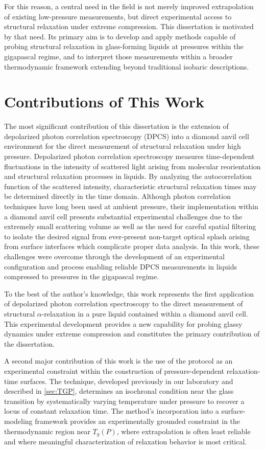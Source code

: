 For this reason, a central need in the field is not merely improved extrapolation of existing low-pressure measurements, but direct experimental access to structural relaxation under extreme compression. This dissertation is motivated by that need. Its primary aim is to develop and apply methods capable of probing structural relaxation in glass-forming liquids at pressures within the gigapascal regime, and to interpret those measurements within a broader thermodynamic framework extending beyond traditional isobaric descriptions.

\section{Contributions of This Work}

The most significant contribution of this dissertation is the extension of depolarized photon correlation spectroscopy (DPCS) into a diamond anvil cell environment for the direct measurement of structural relaxation under high pressure. Depolarized photon correlation spectroscopy measures time-dependent fluctuations in the intensity of scattered light arising from molecular reorientation and structural relaxation processes in liquids. By analyzing the autocorrelation function of the scattered intensity, characteristic structural relaxation times may be determined directly in the time domain. Although photon correlation techniques have long been used at ambient pressure, their implementation within a diamond anvil cell presents substantial experimental challenges due to the extremely small scattering volume as well as the need for careful spatial filtering to isolate the desired signal from ever-present non-target optical splash arising from surface interfaces which complicate proper data analysis. In this work, these challenges were overcome through the development of an experimental configuration and process enabling reliable DPCS measurements in liquids compressed to pressures in the gigapascal regime.

To the best of the author's knowledge, this work represents the first application of depolarized photon correlation spectroscopy to the direct measurement of structural $\alpha$-relaxation in a pure liquid contained within a diamond anvil cell. This experimental development provides a new capability for probing glassy dynamics under extreme compression and constitutes the primary contribution of the dissertation.

A second major contribution of this work is the use of the \tgp protocol as an experimental constraint within the construction of pressure-dependent relaxation-time surfaces. The \tgp technique, developed previously in our laboratory and described in \sect \ref{sec:TGP}, determines an isochronal condition near the glass transition by systematically varying temperature under pressure to recover a locus of constant relaxation time. The \tgp method's incorporation into a surface-modeling framework provides an experimentally grounded constraint in the thermodynamic region near $T_g(P)$, where extrapolation is often least reliable and where meaningful characterization of relaxation behavior is most critical.

